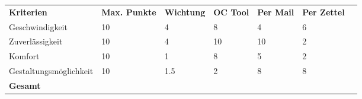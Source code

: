 \begin{tabu}{lllllll}
\rowfont{\bfseries\leavevmode\color{headingfont}}\textbf{Kriterien} & \textbf{Max. Punkte} & \textbf{Wichtung} & \textbf{OC Tool} & \textbf{Per Mail}& \textbf{Per Zettel} \\
Geschwindigkeit & 10 & 4 & 8 & 4 & 6 \\
Zuverlässigkeit & 10 & 4 & 10 & 10 & 2 \\
Komfort & 10 & 1 & 8 & 5 & 2 \\
Gestaltungsmöglichkeit & 10 & 1.5 & 2 & 8 & 8 \\
\hline
\hline
{}\textbf{Gesamt} & & & & & \\
\end{tabu}